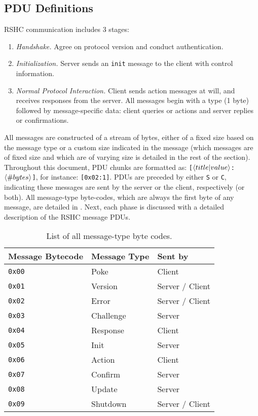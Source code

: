 \subsection{PDU Definitions}
\label{sec:pdus:pdu}

RSHC communication includes 3 stages:

\begin{enumerate}

\item {\em Handshake.} Agree on protocol version and conduct authentication.

\item {\em Initialization.} Server sends an {\tt init} message to the client with control information.

\item {\em Normal Protocol Interaction.} Client sends action messages at will, and receives responses from the server. All messages begin with a type (1 byte) followed by message-specific data: client queries or actions and server replies or confirmations.

\end{enumerate}

All messages are constructed of a stream of bytes, either of a fixed size based on the message type or a custom size indicated in the message (which messages are of fixed size and which are of varying size is detailed in the rest of the section). Throughout this document, PDU chunks are formatted as: {\tt [$\left \langle title | value \right \rangle $:$\left \langle \#bytes \right \rangle $]}, for instance: {\tt [0x02:1]}. PDUs are preceded by either {\tt S} or {\tt C}, indicating these messages are sent by the server or the client, respectively (or both).
All message-type byte-codes, which are always the first byte of any message, are detailed in . Next, each phase is discussed with a detailed description of the RSHC message PDUs.

\begin{table}[ht!]
\centering
\begin{tabular}{l l l}
\hline
\textbf{Message Bytecode} & \textbf{Message Type} & \textbf{Sent by} \\
\hline
\hline

{\tt 0x00}  & Poke      & Client \\
{\tt 0x01}  & Version   & Server / Client \\
{\tt 0x02}  & Error     & Server / Client \\
{\tt 0x03}  & Challenge & Server \\
{\tt 0x04}  & Response  & Client \\
{\tt 0x05}  & Init      & Server \\
{\tt 0x06}  & Action    & Client \\
{\tt 0x07}  & Confirm   & Server \\
{\tt 0x08}  & Update    & Server \\
{\tt 0x09}  & Shutdown  & Server / Client \\

\hline
\hline
\end{tabular}
\caption{\label{tab:pdus:mt}List of all message-type byte codes.}
\end{table}



